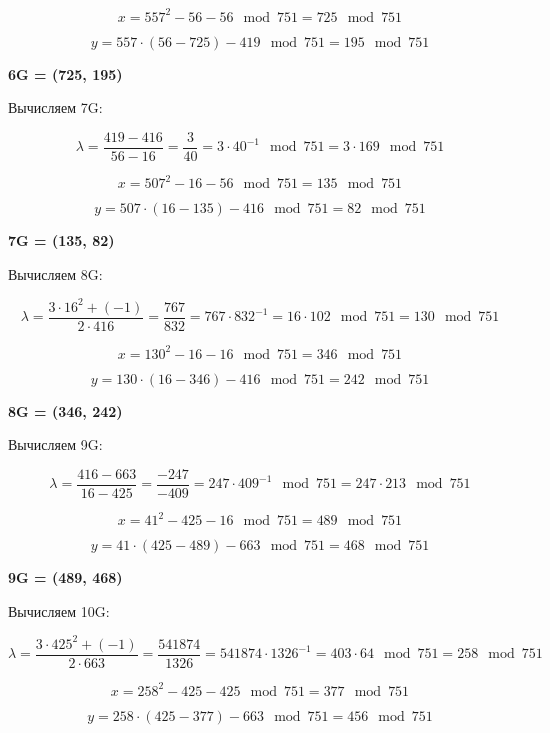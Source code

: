         \[
        x = 557^2 - 56 - 56 \mod{751} = 725\mod{751}
        \]
        

        \[
        y = 557 \cdot (56 - 725) - 419\mod{751} = 195\mod{751}
        \]
        
\textbf{6G = (725, 195)}

Вычисляем 7G:

            \[
            \lambda = \frac{419-416}{56-16} = \frac{3}{40} = 3 \cdot 40^{-1}\mod{751} = 3 \cdot 169\mod{751}
            \]
            

        \[
        x = 507^2 - 16 - 56 \mod{751} = 135\mod{751}
        \]
        

        \[
        y = 507 \cdot (16 - 135) - 416\mod{751} = 82\mod{751}
        \]
        
\textbf{7G = (135, 82)}

Вычисляем 8G:

            \[
            \lambda = \frac{ 3 \cdot 16^2 + (-1) }{2 \cdot 416} = \frac{767}{832} = 767 \cdot 832^{-1} = 16 \cdot 102\mod{751} = 130\mod{751}
            \]
            

        \[
        x = 130^2 - 16 - 16 \mod{751} = 346\mod{751}
        \]
        

        \[
        y = 130 \cdot (16 - 346) - 416\mod{751} = 242\mod{751}
        \]
        
\textbf{8G = (346, 242)}

Вычисляем 9G:

            \[
            \lambda = \frac{416-663}{16-425} = \frac{-247}{-409} = 247 \cdot 409^{-1}\mod{751} = 247 \cdot 213\mod{751}
            \]
            

        \[
        x = 41^2 - 425 - 16 \mod{751} = 489\mod{751}
        \]
        

        \[
        y = 41 \cdot (425 - 489) - 663\mod{751} = 468\mod{751}
        \]
        
\textbf{9G = (489, 468)}

Вычисляем 10G:

            \[
            \lambda = \frac{ 3 \cdot 425^2 + (-1) }{2 \cdot 663} = \frac{541874}{1326} = 541874 \cdot 1326^{-1} = 403 \cdot 64\mod{751} = 258\mod{751}
            \]
            

        \[
        x = 258^2 - 425 - 425 \mod{751} = 377\mod{751}
        \]
        

        \[
        y = 258 \cdot (425 - 377) - 663\mod{751} = 456\mod{751}
        \]
        

